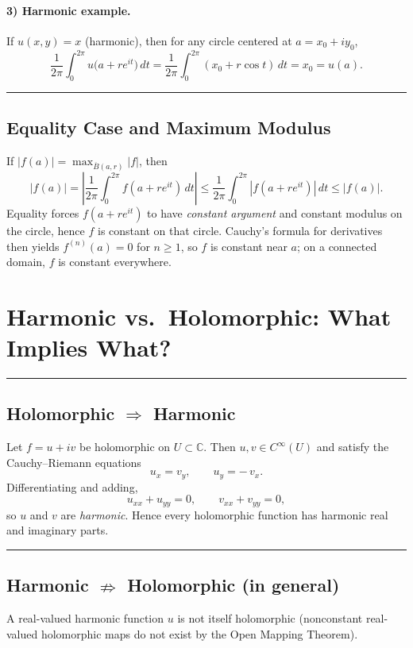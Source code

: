 \documentclass[11pt]{article}
\begin{document}
\medskip

\paragraph{3) Harmonic example.}
If $u(x,y)=x$ (harmonic), then for any circle centered at $a=x_{0}+iy_{0}$,
\[
\frac{1}{2\pi}\int_{0}^{2\pi} u\!\big(a+re^{it}\big)\,dt
=\frac{1}{2\pi}\int_{0}^{2\pi} (x_{0}+r\cos t)\,dt
=x_{0}=u(a).
\]

\bigskip\hrule\bigskip

\subsection*{Equality Case and Maximum Modulus}

If $|f(a)|=\max_{\overline{B}(a,r)}|f|$, then
\[
|f(a)|
=\left|\frac{1}{2\pi}\int_{0}^{2\pi} f(a+re^{it})\,dt\right|
\le \frac{1}{2\pi}\int_{0}^{2\pi}|f(a+re^{it})|\,dt
\le |f(a)|.
\]
Equality forces $f(a+re^{it})$ to have \emph{constant argument} and constant modulus on the circle, hence $f$ is constant on that circle. Cauchy’s formula for derivatives then yields $f^{(n)}(a)=0$ for $n\ge 1$, so $f$ is constant near $a$; on a connected domain, $f$ is constant everywhere.

\section*{Harmonic vs.\ Holomorphic: What Implies What?}

\bigskip\hrule\bigskip

\subsection*{Holomorphic $\Rightarrow$ Harmonic}

Let $f=u+iv$ be holomorphic on $U\subset\mathbb{C}$. Then $u,v\in C^\infty(U)$ and satisfy the Cauchy--Riemann equations
\[
u_x=v_y,\qquad u_y=-\,v_x.
\]
Differentiating and adding,
\[
u_{xx}+u_{yy}=0,\qquad v_{xx}+v_{yy}=0,
\]
so $u$ and $v$ are \emph{harmonic}. Hence every holomorphic function has harmonic real and imaginary parts.

\bigskip\hrule\bigskip

\subsection*{Harmonic $\nRightarrow$ Holomorphic (in general)}

A real-valued harmonic function $u$ is not itself holomorphic (nonconstant real-valued holomorphic maps do not exist by the Open Mapping Theorem).
\end{document}
